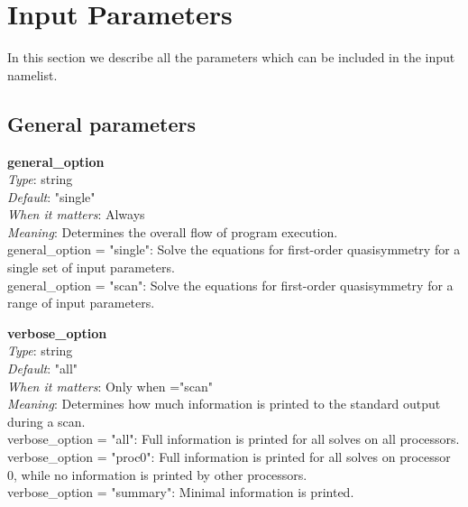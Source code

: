 \chapter{Input Parameters}
\label{ch:input}

\newcommand{\param}[5]{{\setlength{\parindent}{0cm} {\ttfamily \bfseries \hypertarget{#1}{#1}}\\{\it Type}: #2\\{\it Default}: #3\\{\it When it matters}: #4\\{\it Meaning}: #5}}
\newcommand{\myhrule}{{\setlength{\parindent}{0cm} \hrulefill }}

\newcommand{\true}{{\ttfamily .true.}}
\newcommand{\false}{{\ttfamily .false.}}

In this section we describe all the parameters which can be included in the input namelist. \\


\section{General parameters}

\param{general\_option}
{string}
{{\ttfamily "single"}}
{Always}
{Determines the overall flow of program execution.\\

{\ttfamily general\_option} = {\ttfamily "single"}: Solve the equations for first-order quasisymmetry for a single set of input parameters.\\

{\ttfamily general\_option} = {\ttfamily "scan"}: Solve the equations for first-order quasisymmetry for a range of input parameters.\\

}

\myhrule

\param{verbose\_option}
{string}
{{\ttfamily "all"}}
{Only when \parlink{general\_option}={\ttfamily "scan"}}
{Determines how much information is printed to the standard output during a scan.\\

{\ttfamily verbose\_option} = {\ttfamily "all"}: Full information is printed for all solves on all processors.\\

{\ttfamily verbose\_option} = {\ttfamily "proc0"}: Full information is printed for all solves on processor 0, while no information is printed by other processors.\\

{\ttfamily verbose\_option} = {\ttfamily "summary"}: Minimal information is printed.\\
}

